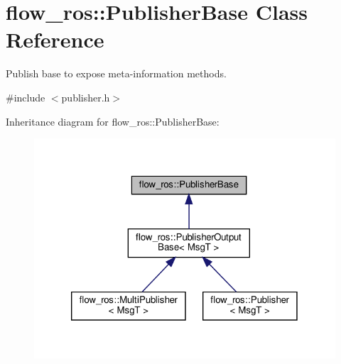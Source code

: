 \hypertarget{classflow__ros_1_1_publisher_base}{}\section{flow\+\_\+ros\+:\+:Publisher\+Base Class Reference}
\label{classflow__ros_1_1_publisher_base}


Publish base to expose meta-\/information methods.  




{\ttfamily \#include $<$publisher.\+h$>$}



Inheritance diagram for flow\+\_\+ros\+:\+:Publisher\+Base\+:\nopagebreak
\begin{figure}[H]
\begin{center}
\leavevmode
\includegraphics[width=320pt]{classflow__ros_1_1_publisher_base__inherit__graph}
\end{center}
\end{figure}
